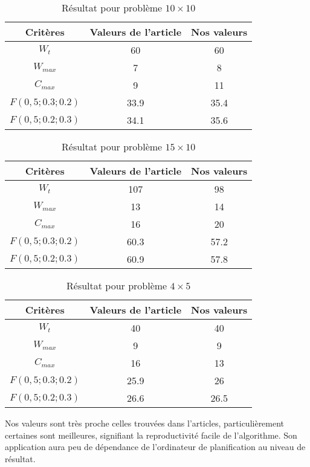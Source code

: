 \documentclass[10pt,a4paper]{scrartcl}
\begin{document}
\begin{table}[!h]
  \centering
  \begin{tabular}{|c|c|c|}
    \hline
    Critères & Valeurs de l'article & Nos valeurs \\
    \hline
    $W_t$ & 60 & 60 \\
    $W_{max}$ & 7 & 8 \\
    $C_{max}$ & 9 & 11 \\
    $F(0,5;0.3;0.2)$ & 33.9 & 35.4 \\
    $F(0,5;0.2;0.3)$ & 34.1 & 35.6 \\
    \hline
  \end{tabular}
  \caption{Résultat pour problème $10 \times 10$}
\end{table}

\begin{table}[!h]
  \centering
  \begin{tabular}{|c|c|c|}
    \hline
    Critères & Valeurs de l'article & Nos valeurs \\
    \hline
    $W_t$ & 107 & 98 \\
    $W_{max}$ & 13 & 14 \\
    $C_{max}$ & 16 & 20 \\
    $F(0,5;0.3;0.2)$ & 60.3 & 57.2 \\
    $F(0,5;0.2;0.3)$ & 60.9 & 57.8 \\
    \hline
  \end{tabular}
  \caption{Résultat pour problème $15 \times 10$}
\end{table}

\begin{table}[!h]
  \centering
  \begin{tabular}{|c|c|c|}
    \hline
    Critères & Valeurs de l'article & Nos valeurs \\
    \hline
    $W_t$ & 40 & 40 \\
    $W_{max}$ & 9 & 9 \\
    $C_{max}$ & 16 & 13 \\
    $F(0,5;0.3;0.2)$ & 25.9 & 26 \\
    $F(0,5;0.2;0.3)$ & 26.6 & 26.5 \\
    \hline
  \end{tabular}
  \caption{Résultat pour problème $4 \times 5$}
\end{table}

Nos valeurs sont très proche celles trouvées dans l'articles, particulièrement certaines sont meilleures, signifiant la reproductivité facile de l'algorithme. Son application aura peu de dépendance de l'ordinateur de planification au niveau de résultat.
\end{document}
